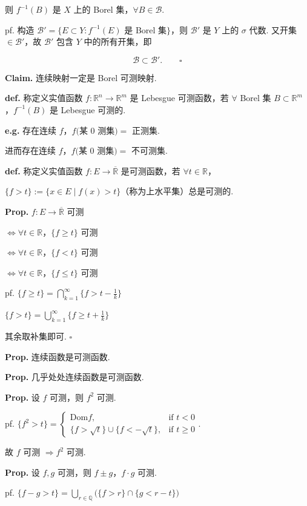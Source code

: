 \documentclass[11pt]{ctexart}
\theoremstyle{definition}
\begin{document}
则 $f^{-1}(B)$ 是 $X$ 上的 Borel 集，$\forall B \in \mathcal{B}$.

pf. 构造 $\mathcal{B}' = \{E \subset Y : f^{-1}(E)$ 是 Borel 集$\}$，则 $\mathcal{B}'$ 是 $Y$ 上的 $\sigma$ 代数. 又开集 $\in \mathcal{B}'$，故 $\mathcal{B}'$ 包含 $Y$ 中的所有开集，即

\[
\mathcal{B} \subset \mathcal{B}'. \qquad \square
\]

\textbf{Claim.} 连续映射一定是 Borel 可测映射.

\textbf{def.} 称定义实值函数 $f: \mathbb{R}^n \to \mathbb{R}^m$ 是 Lebesgue 可测函数，若 $\forall$ Borel 集 $B \subset \mathbb{R}^m$，$f^{-1}(B)$ 是 Lebesgue 可测的.

\textbf{e.g.} 存在连续 $f$，$f($某 0 测集$) =$ 正测集.

进而存在连续 $f$，$f($某 0 测集$) =$ 不可测集.

\textbf{def.} 称定义实值函数 $f: E \to \overline{\mathbb{R}}$ 是可测函数，若 $\forall t \in \mathbb{R}$，

$\{f > t\} := \{x \in E \mid f(x) > t\}$（称为上水平集）总是可测的.

\textbf{Prop.} $f: E \to \overline{\mathbb{R}}$ 可测

$\iff \forall t \in \mathbb{R}$，$\{f \geq t\}$ 可测

$\iff \forall t \in \mathbb{R}$，$\{f < t\}$ 可测

$\iff \forall t \in \mathbb{R}$，$\{f \leq t\}$ 可测

pf. $\{f \geq t\} = \bigcap\limits_{k=1}^{\infty} \{f > t - \tfrac{1}{k}\}$

$\{f > t\} = \bigcup\limits_{k=1}^{\infty} \{f \geq t + \tfrac{1}{k}\}$

其余取补集即可. $\square$

\textbf{Prop.} 连续函数是可测函数.

\textbf{Prop.} 几乎处处连续函数是可测函数.

\textbf{Prop.} 设 $f$ 可测，则 $f^2$ 可测.

pf. $\{f^2 > t\} = \begin{cases} \mathrm{Dom} f, & \text{if } t < 0 \\ \{f > \sqrt{t}\} \cup \{f < -\sqrt{t}\}, & \text{if } t \geq 0 \end{cases}$.

故 $f$ 可测 $\Rightarrow f^2$ 可测.

\textbf{Prop.} 设 $f, g$ 可测，则 $f \pm g$，$f \cdot g$ 可测.

pf. $\{f - g > t\} = \bigcup\limits_{r \in \mathbb{Q}} \big(\{f > r\} \cap \{g < r - t\}\big)$
\end{document}
